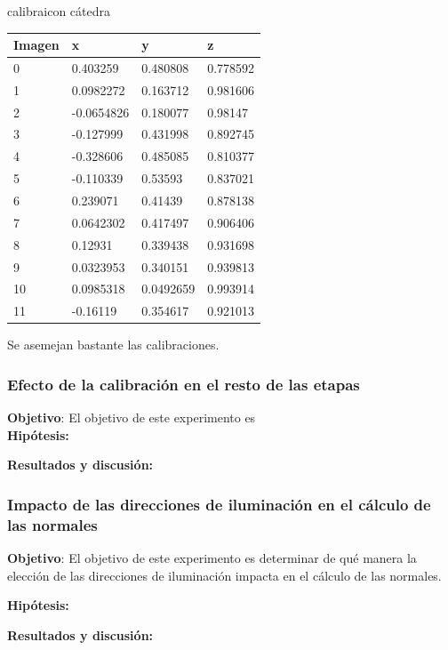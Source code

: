 calibraicon cátedra
\begin{center}
    \begin{tabular}{ | l | l | l | l |}
    \hline
    Imagen & x & y & z \\ \hline
    0 & 0.403259 &  0.480808 & 0.778592 \\ \hline
    1 & 0.0982272 & 0.163712 & 0.981606 \\ \hline
    2 & -0.0654826 & 0.180077 & 0.98147 \\ \hline
    3 & -0.127999 & 0.431998 & 0.892745 \\ \hline
    4 & -0.328606 & 0.485085 & 0.810377\\ \hline
    5 & -0.110339 & 0.53593 & 0.837021 \\ \hline
    6 & 0.239071 & 0.41439 & 0.878138 \\ \hline
    7 & 0.0642302 & 0.417497 & 0.906406 \\ \hline
    8 & 0.12931 & 0.339438 & 0.931698 \\ \hline 
    9 & 0.0323953 & 0.340151 & 0.939813 \\ \hline
    10 & 0.0985318 & 0.0492659 & 0.993914\\ \hline
    11 & -0.16119 & 0.354617 & 0.921013 \\ \hline
    \hline
    \end{tabular}
\end{center}

Se asemejan bastante las calibraciones.

\subsubsection{Efecto de la calibración en el resto de las etapas}
\textbf{Objetivo}:
El objetivo de este experimento es 
\\
\textbf{Hipótesis:}

\textbf{Resultados y discusión:}


\subsubsection{Impacto de las direcciones de iluminación en el cálculo de las normales}
\textbf{Objetivo}:
El objetivo de este experimento es determinar de qué manera la elección de las direcciones de iluminación impacta en el cálculo de las normales. 


\textbf{Hipótesis:}


\textbf{Resultados y discusión:}


